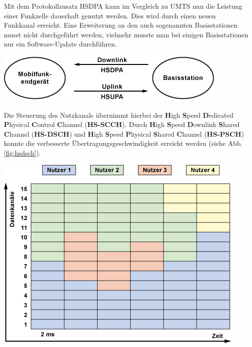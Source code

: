 \begin{multicols}{3}

\noindent
Mit dem Protokollzusatz HSDPA kann im Vergleich zu UMTS nun die Leistung einer Funkzelle dauerhaft genutzt werden. Dies wird durch einen neuen Funkkanal erreicht. Eine Erweiterung an den auch sogenannten Basisstationen musst nicht durchgeführt werden, vielmehr musste man bei einigen Basisstationen nur ein Software-Update durchführen.~\cite{3G.8}

\begin{Figure}
\includegraphics[width=\linewidth]{Kapitel/3G/Grafiken/09102511.png}
\label{fig:hsxpa}
\end{Figure}

Die Steuerung des Nutzkanals übernimmt hierbei der \textbf{H}igh \textbf{S}peed \textbf{D}edicated \textbf{P}hysical \textbf{C}ontrol \textbf{C}hannel (\textbf{HS-SCCH}). Durch \textbf{H}igh \textbf{S}peed \textbf{D}ownlink \textbf{S}hared \textbf{C}hannel (\textbf{HS-DSCH}) und \textbf{H}igh \textbf{S}peed \textbf{P}hysical \textbf{S}hared \textbf{C}hannel (\textbf{HS-PSCH}) konnte die verbesserte Übertragungsgeschwindigkeit erreicht werden (siehe Abb. \ref{fig:hsdsch}). 

\begin{Figure}
\includegraphics[width=\linewidth]{Kapitel/3G/Grafiken/09102512.png}
\label{fig:hsdsch}
\end{Figure}


\end{multicols}
